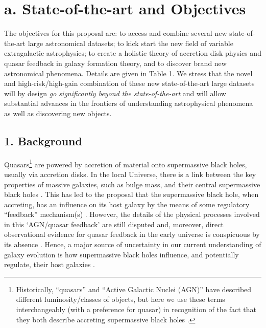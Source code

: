 \section*{a. State-of-the-art and Objectives}
\noindent
The objectives for this proposal are: to access and combine several
new state-of-the-art large astronomical datasets; to kick start the
new field of variable extragalactic astrophysics; to create a holistic
theory of accretion disk physics and quasar feedback in galaxy
formation theory, and to discover brand new astronomical phenomena.
Details are given in Table 1.  We stress that the novel and
high-risk/high-gain combination of these new state-of-the-art large
datasets will by design {\it go significantly beyond the
state-of-the-art} and will allow substantial advances in the frontiers
of understanding astrophysical phenomena as well as discovering new
objects.


\subsection*{1. Background}
\noindent
Quasars\footnote{ Historically, ``quasars'' and ``Active Galactic
Nuclei (AGN)'' have described different luminosity/classes of objects,
but here we use these terms interchangeably (with a preference for 
quasar) in recognition of the fact that they both describe accreting
supermassive black holes \citet[e.g.][]{Haardt2016book}.}  are powered by
accretion of material onto supermassive black holes, usually via
accretion disks.
In the local Universe, there is a link between the key properties of
massive galaxies, such as bulge mass, and their central supermassive
black holes \citep[SMBHs; e.g., ][]{McLure_Dunlop2002, HaringRix2004,
Salviander2007, Greene2010, KormendyHo2013}. This has led to the
proposal that the supermassive black hole, when accreting, has an
influence on its host galaxy by the means of some regulatory
``feedback'' mechanism(s) \citep[e.g., ][]{Sijacki2007, Hopkins2008a,
AlexanderHickox2012, Fabian2012, KingPounds2015}. However, the details
of the physical processes involved in this `AGN/quasar feedback' are still
disputed and, moreover, direct observational evidence for quasar
feedback in the early universe is conspicuous by its absence
\citep[e.g., ][]{HeckmanBest2014, NaabOstriker2017}. Hence, a major
source of uncertainty in our current understanding of galaxy evolution
is how supermassive black holes influence, and potentially regulate,
their host galaxies \citep{Vogelsberger2013, Vogelsberger2014,
Schaye2015, Angles-Alcazar2013, Angles-Alcazar2017}.

